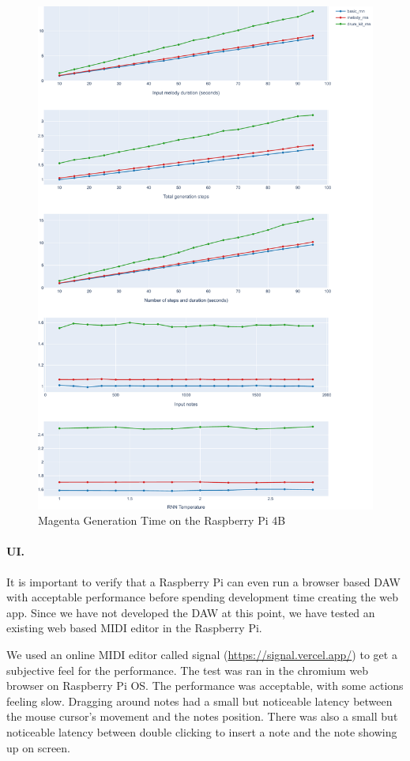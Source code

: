 \begin{figure}
  \centering
  \includegraphics[width=\linewidth]{image/perf.pdf}
  \caption{Magenta Generation Time on the Raspberry Pi 4B}
  \label{fig:magentaperf}
\end{figure}

\paragraph{UI.} It is important to verify that a Raspberry Pi can even run a browser based
DAW with acceptable performance before spending development time creating the web app.
Since we have not developed the DAW at this point, we have tested an existing web based
MIDI editor in the Raspberry Pi.

We used an online MIDI editor called signal (\url{https://signal.vercel.app/}) to get a
subjective feel for the performance. The test was ran in the chromium web browser on
Raspberry Pi OS. The performance was acceptable, with some actions feeling slow.
Dragging around notes had a small but noticeable latency between the mouse cursor's
movement and the notes position. There was also a small but noticeable latency between
double clicking to insert a note and the note showing up on screen.

